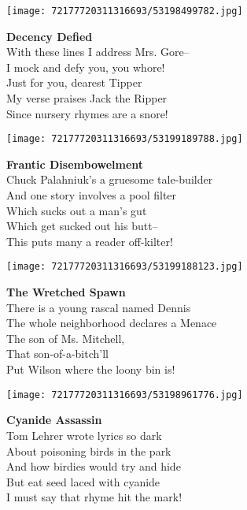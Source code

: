 \documentclass[10pt,letterpaper]{article}
\begin{document}
\begin{center}\texttt{[image: 72177720311316693/53198499782.jpg]}
\end{center}
\begin{center}
\textbf{Decency Defied}\\
\vskip 0.2in
With these lines I address Mrs. Gore--\\
I mock and defy you, you whore!\\
Just for you, dearest Tipper\\
My verse praises Jack the Ripper\\
Since nursery rhymes are a snore!\\
\end{center}
\pagebreak

\begin{center}\texttt{[image: 72177720311316693/53199189788.jpg]}
\end{center}
\begin{center}
\textbf{Frantic Disembowelment}\\
\vskip 0.2in
Chuck Palahniuk's a gruesome tale-builder\\
And one story involves a pool filter\\
Which sucks out a man's gut\\
Which get sucked out his butt--\\
This puts many a reader off-kilter!\\
\end{center}
\pagebreak

\begin{center}
\texttt{[image: 72177720311316693/53199188123.jpg]}
\end{center}

\begin{center}
\textbf{The Wretched Spawn}\\
\vskip 0.2in
There is a young rascal named Dennis\\
The whole neighborhood declares a Menace\\
The son of Ms. Mitchell,\\
That son-of-a-bitch'll\\
Put Wilson where the loony bin is!\\
\end{center}
\pagebreak

\begin{center}\texttt{[image: 72177720311316693/53198961776.jpg]}
\end{center}
\begin{center}
\textbf{Cyanide Assassin}\\
\vskip 0.2in
Tom Lehrer wrote lyrics so dark\\
About poisoning birds in the park\\
And how birdies would try and hide\\
But eat seed laced with cyanide\\
I must say that rhyme hit the mark!\\
\end{center}
\pagebreak
\end{document}
